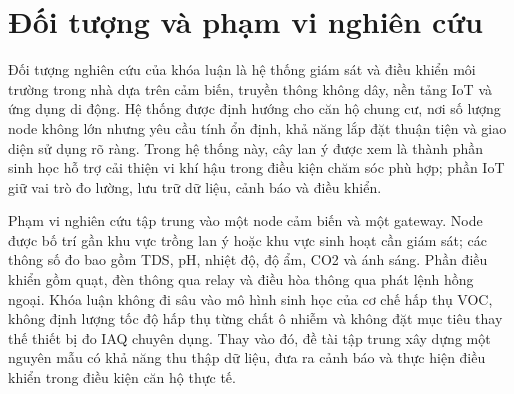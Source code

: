 \section{Đối tượng và phạm vi nghiên cứu}
Đối tượng nghiên cứu của khóa luận là hệ thống giám sát và điều khiển môi trường trong nhà dựa trên cảm biến, truyền thông không dây, nền tảng IoT và ứng dụng di động. Hệ thống được định hướng cho căn hộ chung cư, nơi số lượng node không lớn nhưng yêu cầu tính ổn định, khả năng lắp đặt thuận tiện và giao diện sử dụng rõ ràng. Trong hệ thống này, cây lan ý được xem là thành phần sinh học hỗ trợ cải thiện vi khí hậu trong điều kiện chăm sóc phù hợp; phần IoT giữ vai trò đo lường, lưu trữ dữ liệu, cảnh báo và điều khiển.

Phạm vi nghiên cứu tập trung vào một node cảm biến và một gateway. Node được bố trí gần khu vực trồng lan ý hoặc khu vực sinh hoạt cần giám sát; các thông số đo bao gồm TDS, pH, nhiệt độ, độ ẩm, CO2 và ánh sáng. Phần điều khiển gồm quạt, đèn thông qua relay và điều hòa thông qua phát lệnh hồng ngoại. Khóa luận không đi sâu vào mô hình sinh học của cơ chế hấp thụ VOC, không định lượng tốc độ hấp thụ từng chất ô nhiễm và không đặt mục tiêu thay thế thiết bị đo IAQ chuyên dụng. Thay vào đó, đề tài tập trung xây dựng một nguyên mẫu có khả năng thu thập dữ liệu, đưa ra cảnh báo và thực hiện điều khiển trong điều kiện căn hộ thực tế.
